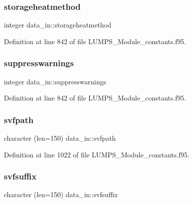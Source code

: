 \subsubsection{\texorpdfstring{storageheatmethod}{storageheatmethod}}
{\footnotesize\ttfamily integer data\+\_\+in\+::storageheatmethod}



Definition at line 842 of file L\+U\+M\+P\+S\+\_\+\+Module\+\_\+constants.\+f95.

\mbox{\label{namespacedata__in_a70af1f33c9424336cb42b8c11bfdf51f}} 
\subsubsection{\texorpdfstring{suppresswarnings}{suppresswarnings}}
{\footnotesize\ttfamily integer data\+\_\+in\+::suppresswarnings}



Definition at line 842 of file L\+U\+M\+P\+S\+\_\+\+Module\+\_\+constants.\+f95.

\mbox{\label{namespacedata__in_a5e692de4d121a71a5a0fd4bcd9d640d2}} 
\subsubsection{\texorpdfstring{svfpath}{svfpath}}
{\footnotesize\ttfamily character (len=150) data\+\_\+in\+::svfpath}



Definition at line 1022 of file L\+U\+M\+P\+S\+\_\+\+Module\+\_\+constants.\+f95.

\mbox{\label{namespacedata__in_a30a09c738fb29d9032e8a4cf1018b0d9}} 
\subsubsection{\texorpdfstring{svfsuffix}{svfsuffix}}
{\footnotesize\ttfamily character (len=150) data\+\_\+in\+::svfsuffix}



